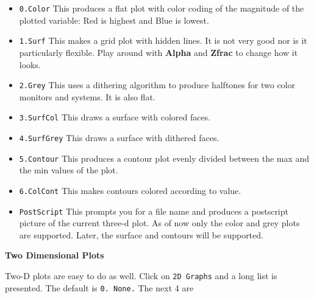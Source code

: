 \begin{itemize}
\item {\tt 0.Color} This produces a flat plot with color coding of the
magnitude of the plotted variable: Red is highest and Blue is lowest.
\item {\tt 1.Surf} This makes a grid plot with hidden lines.  It is
not very good nor is it particularly flexible.  Play around with {\bf
Alpha} and {\bf Zfrac} to change how it looks.  
\item {\tt 2.Grey}  This uses a dithering algorithm to produce
halftones for two color monitors and systems.  It is also flat.
\item {\tt 3.SurfCol} This draws a surface with colored faces.
\item {\tt 4.SurfGrey} This draws a surface with dithered faces.
\item {\tt 5.Contour} This produces a contour plot evenly divided
between the max and the min values of the plot.
\item {\tt 6.ColCont} This makes contours colored according to value.
\item {\tt PostScript} This prompts you for a file name and produces a
postscript picture of the current three-d plot.  As of now only the
color and grey plots are supported.  Later, the surface and contours
will be supported.
\end{itemize}
\vspace{.25 in}
\begin{center}
{\bf \large Two Dimensional Plots}
\end{center}
Two-D plots are easy to do as well. Click on {\tt 2D Graphs} and a
long list is presented.  The default is {\tt 0. None.}  The next 4 are
